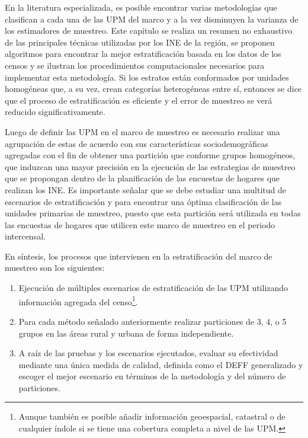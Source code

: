 \documentclass[
  10pt,
  spanish,
]{book}
\providecommand{\tightlist}{%
  \setlength{\itemsep}{0pt}\setlength{\parskip}{0pt}}
\begin{document}
En la literatura especializada, es posible encontrar varias metodologías que clasifican a cada una de las UPM del marco y a la vez disminuyen la varianza de los estimadores de muestreo. Este capítulo se realiza un resumen no exhaustivo de las principales técnicas utilizadas por los INE de la región, se proponen algoritmos para encontrar la mejor estratificación basada en los datos de los censos y se ilustran los procedimientos computacionales necesarios para implementar esta metodología. Si los estratos están conformados por unidades homogéneas que, a su vez, crean categorías heterogéneas entre sí, entonces se dice que el proceso de estratificación es eficiente y el error de muestreo se verá reducido significativamente.

Luego de definir las UPM en el marco de muestreo es necesario realizar una agrupación de estas de acuerdo con sus características sociodemográficas agregadas con el fin de obtener una partición que conforme grupos homogéneos, que induzcan una mayor precisión en la ejecución de las estrategias de muestreo que se propongan dentro de la planificación de las encuestas de hogares que realizan los INE. Es importante señalar que se debe estudiar una multitud de escenarios de estratificación y para encontrar una óptima clasificación de las unidades primarias de muestreo, puesto que esta partición será utilizada en todas las encuestas de hogares que utilicen este marco de muestreo en el periodo intercensal.

En síntesis, los procesos que intervienen en la estratificación del marco de muestreo son los siguientes:

\begin{enumerate}
\def\labelenumi{\arabic{enumi}.}
\tightlist
\item
  Ejecución de múltiples escenarios de estratificación de las UPM utilizando información agregada del censo\footnote{Aunque también es posible añadir información geoespacial, catastral o de cualquier índole si se tiene una cobertura completa a nivel de las UPM.}.
\item
  Para cada método señalado anteriormente realizar particiones de 3, 4, o 5 grupos en las áreas rural y urbana de forma independiente.
\item
  A raíz de las pruebas y los escenarios ejecutados, evaluar su efectividad mediante una única medida de calidad, definida como el DEFF generalizado y escoger el mejor escenario en términos de la metodología y del número de particiones.
\end{enumerate}
\end{document}
